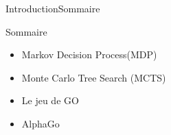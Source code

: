 \begin{frame}{Introduction}{Sommaire}
	\begin{center}
		\begin{block}{Sommaire}
			\begin{itemize}[label=\textbullet, font=\LARGE \color{black}]
				\item Markov Decision Process(MDP)
				\item Monte Carlo Tree Search (MCTS)
				\item Le jeu de GO
				\item AlphaGo
			\end{itemize}
		\end{block}
	\end{center}
\end{frame}